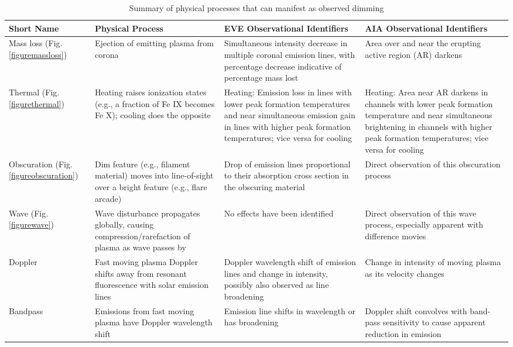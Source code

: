 \begin{table}[!htb]
    \caption{Summary of physical processes that can manifest as observed dimming}
    \begin{center}
    \begin{tabular}{|p{2.5cm}|p{4cm}|p{4cm}|p{4cm}|} \hline
	Short Name & Physical Process & EVE Observational Identifiers & AIA Observational Identifiers \\ \hline \hline
	Mass loss (Fig. \ref{figuremassloss}) & Ejection of emitting plasma from corona & Simultaneous intensity decrease in multiple coronal emission lines, with percentage decrease indicative of percentage mass lost & Area over and near the erupting active region (AR) darkens \\ \hline
	
	Thermal (Fig. \ref{figurethermal}) & Heating raises ionization states (e.g., a fraction of Fe IX becomes Fe X); cooling does the opposite & Heating: Emission loss in lines with lower peak formation temperatures and near simultaneous emission gain in lines with higher peak formation temperatures; vice versa for cooling & Heating: Area near AR darkens in channels with lower peak formation temperature and near simultaneous brightening in channels with higher peak formation temperatures; vice versa for cooling \\ \hline
	
	Obscuration (Fig. \ref{figureobscuration}) & Dim feature (e.g., filament material) moves into line-of-sight over a bright feature (e.g., flare arcade) & Drop of emission lines proportional to their absorption cross section in the obscuring material & Direct observation of this obscuration process \\ \hline
	
	Wave (Fig. \ref{figurewave}) & Wave disturbance propagates globally, causing compression/rarefaction of plasma as wave passes by & No effects have been identified & Direct observation of this wave process, especially apparent with difference movies \\ \hline
	
	Doppler & Fast moving plasma Doppler shifts away from resonant fluorescence with solar emission lines & Doppler wavelength shift of emission lines and change in intensity, possibly also observed as line broadening & Change in intensity of moving plasma as its velocity changes \\ \hline
	
	Bandpass & Emissions from fast moving plasma have Doppler wavelength shift & Emission line shifts in wavelength or has broadening & Doppler shift convolves with band-pass sensitivity to cause apparent reduction in emission \\ \hline
	
	\end{tabular}
    \\ \rule{0mm}{5mm}
    \end{center}
    \label{tablesummary}
\end{table}

